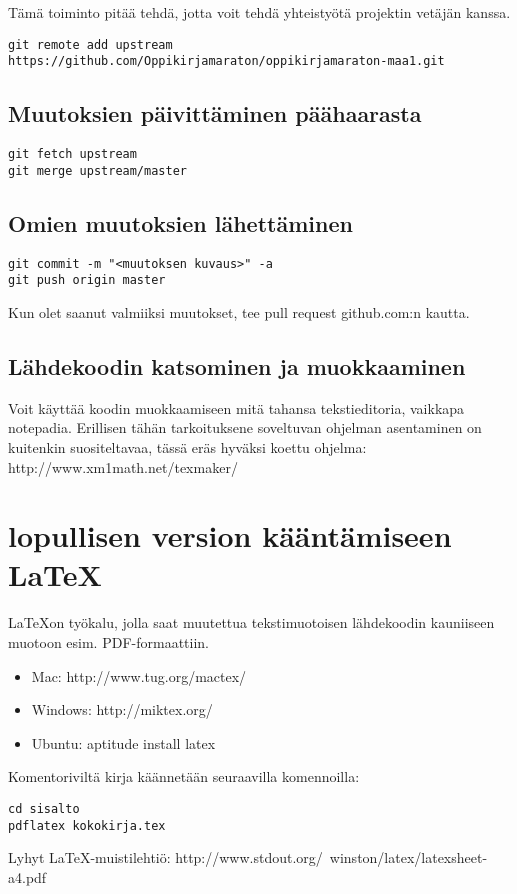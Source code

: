 Tämä toiminto pitää tehdä, jotta voit tehdä yhteistyötä projektin vetäjän kanssa.

\begin{verbatim}
git remote add upstream https://github.com/Oppikirjamaraton/oppikirjamaraton-maa1.git
\end{verbatim}

\subsection{Muutoksien päivittäminen päähaarasta}

\begin{verbatim}
git fetch upstream
git merge upstream/master
\end{verbatim}

\subsection{Omien muutoksien lähettäminen}

\begin{verbatim}
git commit -m "<muutoksen kuvaus>" -a
git push origin master
\end{verbatim}

Kun olet saanut valmiiksi muutokset, tee pull request github.com:n kautta.

\subsection{Lähdekoodin katsominen ja muokkaaminen}

Voit käyttää koodin muokkaamiseen mitä tahansa tekstieditoria, vaikkapa notepadia. Erillisen tähän tarkoituksene soveltuvan ohjelman asentaminen on kuitenkin suositeltavaa, tässä eräs hyväksi koettu ohjelma: http://www.xm1math.net/texmaker/

\section{lopullisen version kääntämiseen \LaTeX}

\LaTeX on työkalu, jolla saat muutettua tekstimuotoisen lähdekoodin kauniiseen muotoon esim. PDF-formaattiin.

\begin{itemize}

\item Mac: http://www.tug.org/mactex/
\item Windows: http://miktex.org/
\item Ubuntu: aptitude install latex

\end{itemize}

Komentoriviltä kirja käännetään seuraavilla komennoilla:

\begin{verbatim}
cd sisalto
pdflatex kokokirja.tex
\end{verbatim}

Lyhyt \LaTeX -muistilehtiö: http://www.stdout.org/~winston/latex/latexsheet-a4.pdf

